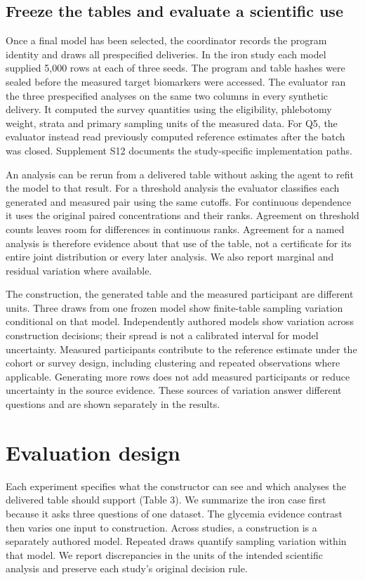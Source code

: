 \documentclass[11pt,letterpaper]{article}
\begin{document}
\subsection{Freeze the tables and evaluate a scientific use}

Once a final model has been selected, the coordinator records the program identity and draws all prespecified deliveries. In the iron study each model supplied 5,000 rows at each of three seeds. The program and table hashes were sealed before the measured target biomarkers were accessed. The evaluator ran the three prespecified analyses on the same two columns in every synthetic delivery. It computed the survey quantities using the eligibility, phlebotomy weight, strata and primary sampling units of the measured data. For Q5, the evaluator instead read previously computed reference estimates after the batch was closed. Supplement S12 documents the study-specific implementation paths.


An analysis can be rerun from a delivered table without asking the agent to refit the model to that result. For a threshold analysis the evaluator classifies each generated and measured pair using the same cutoffs. For continuous dependence it uses the original paired concentrations and their ranks. Agreement on threshold counts leaves room for differences in continuous ranks. Agreement for a named analysis is therefore evidence about that use of the table, not a certificate for its entire joint distribution or every later analysis. We also report marginal and residual variation where available.


The construction, the generated table and the measured participant are different units. Three draws from one frozen model show finite-table sampling variation conditional on that model. Independently authored models show variation across construction decisions; their spread is not a calibrated interval for model uncertainty. Measured participants contribute to the reference estimate under the cohort or survey design, including clustering and repeated observations where applicable. Generating more rows does not add measured participants or reduce uncertainty in the source evidence. These sources of variation answer different questions and are shown separately in the results.


\section{Evaluation design}

Each experiment specifies what the constructor can see and which analyses the delivered table should support (Table 3). We summarize the iron case first because it asks three questions of one dataset. The glycemia evidence contrast then varies one input to construction. Across studies, a construction is a separately authored model. Repeated draws quantify sampling variation within that model. We report discrepancies in the units of the intended scientific analysis and preserve each study's original decision rule.
\end{document}
